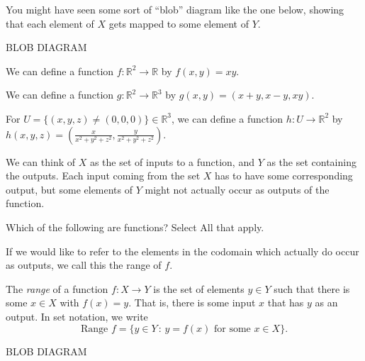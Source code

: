 \documentclass{ximera}
\begin{document}
You might have seen some sort of ``blob'' diagram like the one below, showing that each element of $X$ gets mapped to some element of $Y$.

BLOB DIAGRAM

\begin{example}
We can define a function $f:\mathbb{R}^2\rightarrow\mathbb{R}$ by $f(x,y) = xy$.

We can define a function $g:\mathbb{R}^2\rightarrow\mathbb{R}^3$ by $g(x,y) = (x+y, x-y, xy)$.

For $U = \{(x,y,z)\neq (0,0,0)\}\in\mathbb{R}^3$, we can define a function $h:U\rightarrow \mathbb{R}^2$ by $h(x,y,z) = \left(\frac{x}{x^2+y^2+z^2}, \frac{y}{x^2+y^2+z^2}\right)$.

\end{example}


We can think of $X$ as the set of inputs to a function, and $Y$ as the set containing the outputs. Each input coming from the set $X$ has to have some corresponding output, but some elements of $Y$ might not actually occur as outputs of the function.

\begin{problem}
Which of the following are functions? Select All that apply.
\begin{selectAll}
\end{selectAll}
\end{problem}

If we would like to refer to the elements in the codomain which actually do occur as outputs, we call this the range of $f$.

\begin{definition}
The \emph{range} of a function $f:X\rightarrow Y$ is the set of elements $y\in Y$ such that there is some $x\in X$ with $f(x) = y$. That is, there is some input $x$ that has $y$ as an output. In set notation, we write
\[
\textrm{Range }f = \{y\in Y\,:\, y = f(x) \textrm{ for some } x\in X\}.
\]
\end{definition}

BLOB DIAGRAM
\end{document}
